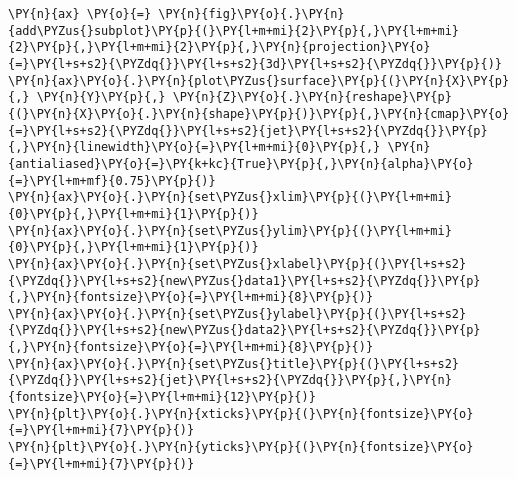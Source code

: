 \begin{tcolorbox}[breakable, size=fbox, boxrule=1pt, pad at break*=1mm,colback=cellbackground, colframe=cellborder]
\begin{Verbatim}[commandchars=\\\{\}]
\PY{n}{ax} \PY{o}{=} \PY{n}{fig}\PY{o}{.}\PY{n}{add\PYZus{}subplot}\PY{p}{(}\PY{l+m+mi}{2}\PY{p}{,}\PY{l+m+mi}{2}\PY{p}{,}\PY{l+m+mi}{2}\PY{p}{,}\PY{n}{projection}\PY{o}{=}\PY{l+s+s2}{\PYZdq{}}\PY{l+s+s2}{3d}\PY{l+s+s2}{\PYZdq{}}\PY{p}{)}
\PY{n}{ax}\PY{o}{.}\PY{n}{plot\PYZus{}surface}\PY{p}{(}\PY{n}{X}\PY{p}{,} \PY{n}{Y}\PY{p}{,} \PY{n}{Z}\PY{o}{.}\PY{n}{reshape}\PY{p}{(}\PY{n}{X}\PY{o}{.}\PY{n}{shape}\PY{p}{)}\PY{p}{,}\PY{n}{cmap}\PY{o}{=}\PY{l+s+s2}{\PYZdq{}}\PY{l+s+s2}{jet}\PY{l+s+s2}{\PYZdq{}}\PY{p}{,}\PY{n}{linewidth}\PY{o}{=}\PY{l+m+mi}{0}\PY{p}{,} \PY{n}{antialiased}\PY{o}{=}\PY{k+kc}{True}\PY{p}{,}\PY{n}{alpha}\PY{o}{=}\PY{l+m+mf}{0.75}\PY{p}{)}
\PY{n}{ax}\PY{o}{.}\PY{n}{set\PYZus{}xlim}\PY{p}{(}\PY{l+m+mi}{0}\PY{p}{,}\PY{l+m+mi}{1}\PY{p}{)}
\PY{n}{ax}\PY{o}{.}\PY{n}{set\PYZus{}ylim}\PY{p}{(}\PY{l+m+mi}{0}\PY{p}{,}\PY{l+m+mi}{1}\PY{p}{)}
\PY{n}{ax}\PY{o}{.}\PY{n}{set\PYZus{}xlabel}\PY{p}{(}\PY{l+s+s2}{\PYZdq{}}\PY{l+s+s2}{new\PYZus{}data1}\PY{l+s+s2}{\PYZdq{}}\PY{p}{,}\PY{n}{fontsize}\PY{o}{=}\PY{l+m+mi}{8}\PY{p}{)}
\PY{n}{ax}\PY{o}{.}\PY{n}{set\PYZus{}ylabel}\PY{p}{(}\PY{l+s+s2}{\PYZdq{}}\PY{l+s+s2}{new\PYZus{}data2}\PY{l+s+s2}{\PYZdq{}}\PY{p}{,}\PY{n}{fontsize}\PY{o}{=}\PY{l+m+mi}{8}\PY{p}{)}
\PY{n}{ax}\PY{o}{.}\PY{n}{set\PYZus{}title}\PY{p}{(}\PY{l+s+s2}{\PYZdq{}}\PY{l+s+s2}{jet}\PY{l+s+s2}{\PYZdq{}}\PY{p}{,}\PY{n}{fontsize}\PY{o}{=}\PY{l+m+mi}{12}\PY{p}{)}
\PY{n}{plt}\PY{o}{.}\PY{n}{xticks}\PY{p}{(}\PY{n}{fontsize}\PY{o}{=}\PY{l+m+mi}{7}\PY{p}{)}
\PY{n}{plt}\PY{o}{.}\PY{n}{yticks}\PY{p}{(}\PY{n}{fontsize}\PY{o}{=}\PY{l+m+mi}{7}\PY{p}{)}


\end{Verbatim}
\end{tcolorbox}
